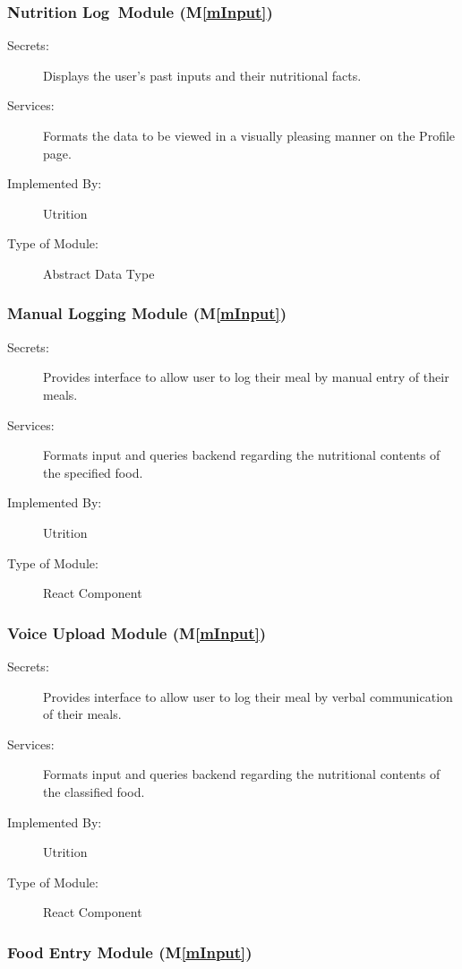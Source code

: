 \documentclass[12pt, titlepage]{article}
\newcommand{\mref}[1]{M\ref{#1}}
\begin{document}
\subsubsection{Nutrition Log Module (\mref{mInput})}

\begin{description}
	\item[Secrets:]Displays the user's past inputs and their nutritional facts.
	\item[Services:]Formats the data to be viewed in a visually pleasing manner 
	on the Profile page.
	\item[Implemented By:] Utrition
	\item[Type of Module:] Abstract Data Type
	
\end{description}

\subsubsection{Manual Logging Module (\mref{mInput})}

\begin{description}
\item[Secrets:]Provides interface to allow user to log their meal by manual 
entry of their meals.
\item[Services:]Formats input and queries backend regarding the nutritional 
contents of the specified food.
\item[Implemented By:] Utrition
\item[Type of Module:] React Component
\end{description}

\subsubsection{Voice Upload Module (\mref{mInput})}

\begin{description}
\item[Secrets:]Provides interface to allow user to log their meal by verbal 
communication of their meals.
\item[Services:]Formats input and queries backend regarding the nutritional 
contents of the classified food.
\item[Implemented By:] Utrition
\item[Type of Module:] React Component
\end{description}

\subsubsection{Food Entry Module (\mref{mInput})}
\end{document}
